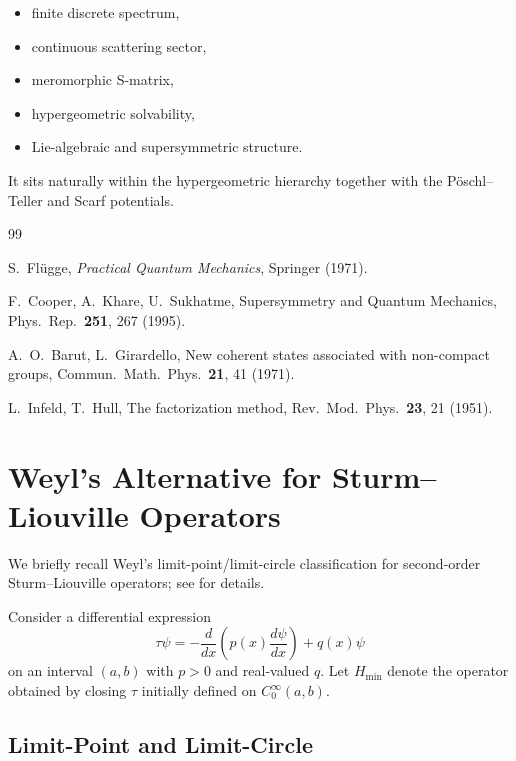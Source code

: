 \documentclass[11pt]{article}
\begin{document}
\begin{itemize}
\item finite discrete spectrum,
\item continuous scattering sector,
\item meromorphic S-matrix,
\item hypergeometric solvability,
\item Lie-algebraic and supersymmetric structure.
\end{itemize}

It sits naturally within the hypergeometric hierarchy together
with the P\"oschl--Teller and Scarf potentials.

\begin{thebibliography}{99}

S.~Fl\"ugge,
\textit{Practical Quantum Mechanics},
Springer (1971).

F.~Cooper, A.~Khare, U.~Sukhatme,
Supersymmetry and Quantum Mechanics,
Phys.\ Rep.\ \textbf{251}, 267 (1995).

A.~O.~Barut, L.~Girardello,
New coherent states associated with non-compact groups,
Commun.\ Math.\ Phys.\ \textbf{21}, 41 (1971).

L.~Infeld, T.~Hull,
The factorization method,
Rev.\ Mod.\ Phys.\ \textbf{23}, 21 (1951).

\end{thebibliography}
\appendix

\section{Weyl's Alternative for Sturm--Liouville Operators}

We briefly recall Weyl’s limit-point/limit-circle classification
for second-order Sturm--Liouville operators; see
\cite{reed-simon2,teschl} for details.

Consider a differential expression
\begin{equation}
\tau \psi
=
-\frac{d}{dx}\!\left(p(x)\frac{d\psi}{dx}\right)
+ q(x)\psi
\end{equation}
on an interval $(a,b)$ with $p>0$ and real-valued $q$.
Let $H_{\min}$ denote the operator obtained by closing
$\tau$ initially defined on $C_0^\infty(a,b)$.

\subsection*{Limit-Point and Limit-Circle}
\end{document}
